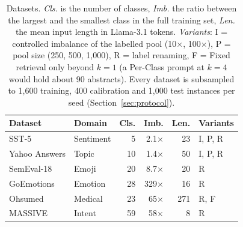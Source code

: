 \begin{table}[t]
  \centering
  \footnotesize
  \setlength{\tabcolsep}{3pt}
  \begin{tabular}{llrrrl}
    \toprule
    \textbf{Dataset} & \textbf{Domain} & \textbf{Cls.} & \textbf{Imb.} & \textbf{Len.} & \textbf{Variants} \\
    \midrule
    SST-5         & Sentiment &  5 & 2.1$\times$ &  23 & I, P, R \\
    Yahoo Answers & Topic        & 10 & 1.4$\times$ &  50 & I, P, R \\
    SemEval-18    & Emoji      & 20 & 8.7$\times$ &  20 & R \\
    GoEmotions    & Emotion    & 28 & 329$\times$ &  16 & R \\
    Ohsumed       & Medical & 23 & 65$\times$  & 271 & R, F \\
    MASSIVE       & Intent  & 59 & 58$\times$  &   8 & R \\ %
    \bottomrule
  \end{tabular}
  \caption{Datasets. \emph{Cls.} is the number of classes, \emph{Imb.} the ratio between the largest and the smallest class in the full training set, \emph{Len.} the mean input length in Llama-3.1 tokens. \emph{Variants}: I = controlled imbalance of the labelled pool (10$\times$, 100$\times$), P = pool size (250, 500, 1,000), R = label renaming, F = Fixed retrieval only beyond $k = 1$ (a Per-Class prompt at $k = 4$ would hold about 90 abstracts). Every dataset is subsampled to 1,600 training, 400 calibration and 1,000 test instances per seed (Section~\ref{sec:protocol}).}
  \label{tab:datasets}
\end{table}

